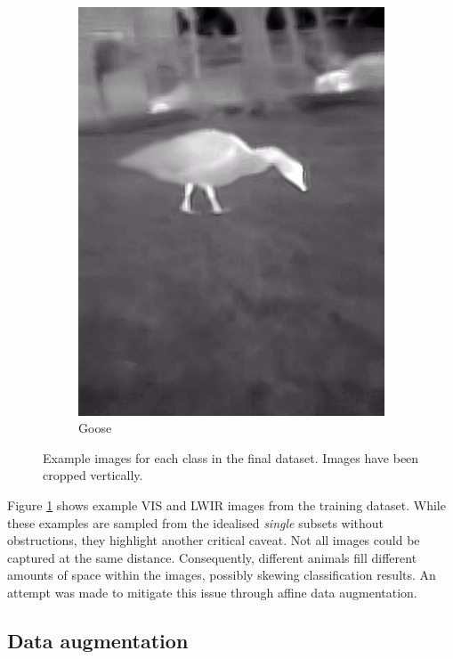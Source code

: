 \documentclass{l4proj}
\begin{document}
\begin{figure}[ht]
\begin{subfigure}[h!]{0.18\textwidth}
    \includegraphics[width=\textwidth, trim={0cm 2.5cm 0cm 2.5cm}, clip]{images/dataset/goose/lwir.png}
    \caption{Goose}
  \end{subfigure}
  \caption{Example images for each class in the final dataset. Images have been cropped vertically.}
  \label{fig:dataset_classes}
\end{figure}

Figure \ref{fig:dataset_classes} shows example VIS and LWIR images from the training dataset. While these examples are sampled from the idealised \textit{single} subsets without obstructions, they highlight another critical caveat. Not all images could be captured at the same distance. Consequently, different animals fill different amounts of space within the images, possibly skewing classification results. An attempt was made to mitigate this issue through affine data augmentation.

\subsection{Data augmentation}
\end{document}
